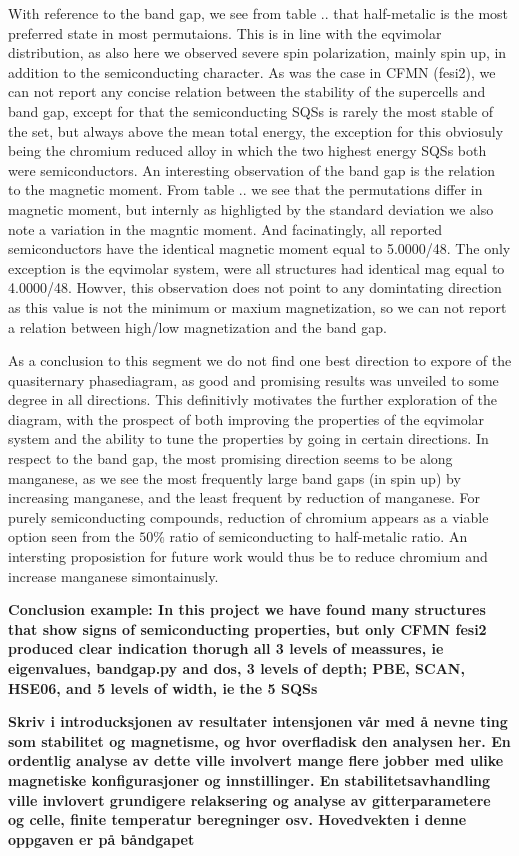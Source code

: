 With reference to the band gap, we see from table .. that half-metalic is the most preferred state in most permutaions. This is in line with the eqvimolar distribution, as also here we observed severe spin polarization, mainly spin up, in addition to the semiconducting character. As was the case in CFMN (fesi2), we can not report any concise relation between the stability of the supercells and band gap, except for that the semiconducting SQSs is rarely the most stable of the set, but always above the mean total energy, the exception for this obviosuly being the chromium reduced alloy in which the two highest energy SQSs both were semiconductors. An interesting observation of the band gap is the relation to the magnetic moment. From table .. we see that the permutations differ in magnetic moment, but internly as highligted by the standard deviation we also note a variation in the magntic moment. And facinatingly, all reported semiconductors have the identical magnetic moment equal to 5.0000/48. The only exception is the eqvimolar system, were all structures had identical mag equal to 4.0000/48. Howver, this observation does not point to any domintating direction as this value is not the minimum or maxium magnetization, so we can not report a relation between high/low magnetization and the band gap.         

As a conclusion to this segment we do not find one best direction to expore of the quasiternary phasediagram, as good and promising results was unveiled to some degree in all directions. This definitivly motivates the further exploration of the diagram, with the prospect of both improving the properties of the eqvimolar system and the ability to tune the properties by going in certain directions. In respect to the band gap, the most promising direction seems to be along manganese, as we see the most frequently large band gaps (in spin up) by increasing manganese, and the least frequent by reduction of manganese. For purely semiconducting compounds, reduction of chromium appears as a viable option seen from the $50\%$ ratio of semiconducting to half-metalic ratio. An intersting proposistion for future work would thus be to reduce chromium and increase manganese simontainusly. 

\textbf{Conclusion example: In this project we have found many structures that show signs of semiconducting properties, but only CFMN fesi2 produced clear indication thorugh all 3 levels of meassures, ie eigenvalues, bandgap.py and dos, 3 levels of depth; PBE, SCAN, HSE06, and 5 levels of width, ie the 5 SQSs}

\textbf{Skriv i introducksjonen av resultater intensjonen vår med å nevne ting som stabilitet og magnetisme, og hvor overfladisk den analysen her. En ordentlig analyse av dette ville involvert mange flere jobber med ulike magnetiske konfigurasjoner og innstillinger. En stabilitetsavhandling ville invlovert grundigere relaksering og analyse av gitterparametere og celle, finite temperatur beregninger osv. Hovedvekten i denne oppgaven er på båndgapet}